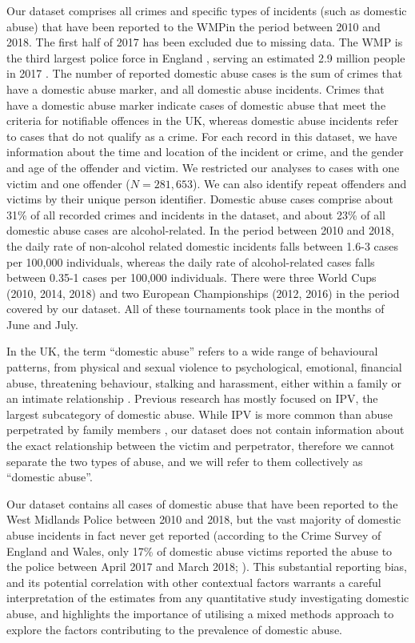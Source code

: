 \documentclass[12pt, a4paper]{article}
\begin{document}
Our dataset comprises all crimes and specific types of incidents (such as domestic abuse) that have been reported to the WMPin the period between 2010 and 2018. The first half of 2017 has been excluded due to missing data. The WMP is the third largest police force in England \cite{Homeoffice}, serving an estimated 2.9 million people in 2017 \cite{populationfigure}. The number of reported domestic abuse cases is the sum of crimes that have a domestic abuse marker, and all domestic abuse incidents. Crimes that have a domestic abuse marker indicate cases of domestic abuse that meet the criteria for notifiable offences in the UK, whereas domestic abuse incidents refer to cases that do not qualify as a crime. For each record in this dataset, we have information about the time and location of the incident or crime, and the gender and age of the offender and victim. We restricted our analyses to cases with one victim and one offender ($N=281,653$). We can also identify repeat offenders and victims by their unique person identifier. Domestic abuse cases comprise about 31\% of all recorded crimes and incidents in the dataset, and about 23\% of all domestic abuse cases are alcohol-related. In the period between 2010 and 2018, the daily rate of non-alcohol related domestic incidents falls between 1.6-3 cases per 100,000 individuals, whereas the daily rate of alcohol-related cases falls between 0.35-1 cases per 100,000 individuals. There were three World Cups (2010, 2014, 2018) and two European Championships (2012, 2016) in the period covered by our dataset. All of these tournaments took place in the months of June and July.

In the UK, the term ``domestic abuse'' refers to a wide range of behavioural patterns, from physical and sexual violence to psychological, emotional, financial abuse, threatening behaviour, stalking and harassment, either within a family or an intimate relationship \cite{ONS}. Previous research has mostly focused on IPV, the largest subcategory of domestic abuse. While IPV is more common than abuse perpetrated by family members \cite{ONS}, our dataset does not contain information about the exact relationship between the victim and perpetrator, therefore we cannot separate the two types of abuse, and we will refer to them collectively as ``domestic abuse''.


Our dataset contains all cases of domestic abuse that have been reported to the West Midlands Police between 2010 and 2018, but the vast majority of domestic abuse incidents in fact never get reported (according to the Crime Survey of England and Wales, only 17\% of domestic abuse victims reported the abuse to the police between April 2017 and March 2018; ). This substantial reporting bias, and its potential correlation with other contextual factors warrants a careful interpretation of the estimates from any quantitative study investigating domestic abuse, and highlights the importance of utilising a mixed methods approach to explore the factors contributing to the prevalence of domestic abuse. 
\end{document}
